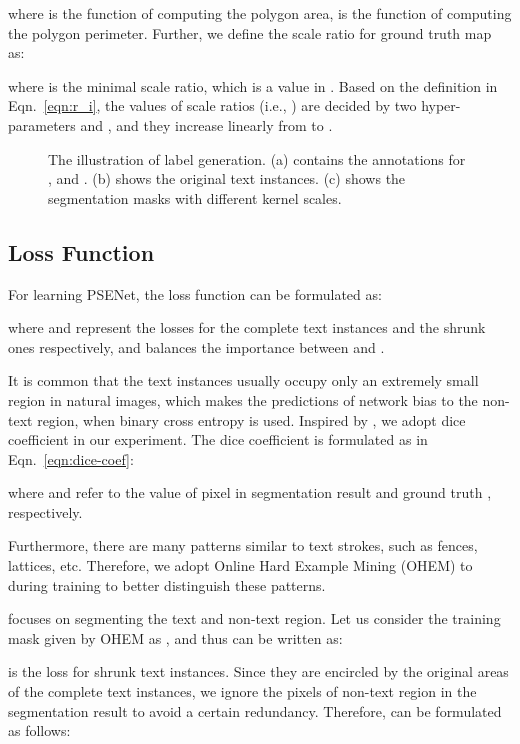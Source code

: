 \documentclass{article}
\begin{document}
where  is the function of computing the polygon area,  is the function of computing the polygon perimeter. Further, we define the scale ratio  for ground truth map  as:

where  is the minimal scale ratio, which is a value in . Based on the definition in Eqn.~\eqref{eqn:r_i}, the values of scale ratios (i.e., ) are decided by two hyper-parameters  and , and they increase linearly from  to .



\begin{figure}[t]
  \centering
  \setlength{\fboxrule}{0pt}
  \vspace{-8pt}
  \caption{The illustration of label generation. (a) contains the annotations for ,  and . (b) shows the original text instances. (c) shows the segmentation masks with different kernel scales.}
  \label{fig:label_gen}

\end{figure}

\subsection{Loss Function}
For learning PSENet, the loss function can be formulated as:

where  and  represent the losses for the complete text instances and the shrunk ones respectively, and  balances the importance between  and . 

It is common that the text instances usually occupy only an extremely small region in natural images, which makes the predictions of network bias to the non-text region, when binary cross entropy \cite{de2005tutorial} is used. Inspired by \cite{milletari2016v}, we adopt dice coefficient in our experiment. The dice coefficient  is formulated as in Eqn.~\eqref{eqn:dice-coef}:

where  and  refer to the value of pixel  in segmentation result  and ground truth , respectively. 

Furthermore, there are many patterns similar to text strokes, such as fences, lattices, etc. Therefore, we adopt Online Hard Example Mining (OHEM) \cite{shrivastava2016training} to  during training to better distinguish these patterns.

 focuses on segmenting the text and non-text region. Let us consider the training mask given by OHEM as , and thus  can be written as:

 is the loss for shrunk text instances. Since they are encircled by the original areas of the complete text instances, we ignore the pixels of non-text region in the segmentation result  to avoid a certain redundancy. Therefore,  can be formulated as follows:
\end{document}
